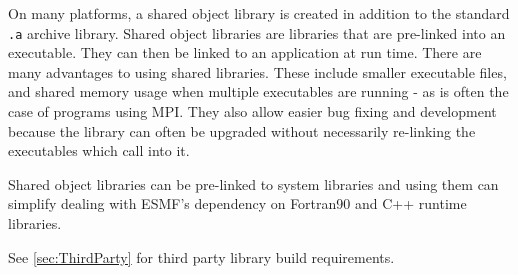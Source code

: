 On many platforms, a shared object library is created in addition to the
standard {\tt .a} archive library.
Shared object libraries are libraries that are pre-linked into an executable.
They can then be linked to an application at run time.  There are many advantages
to using shared libraries.  These include smaller executable files, and shared
memory usage when multiple executables are running - as is often the case of
programs using MPI.  They also allow easier bug fixing and development because
the library can often be upgraded without necessarily re-linking the executables
which call into it.

Shared object libraries can be pre-linked to system libraries and using them
can simplify dealing with ESMF's dependency on Fortran90 and C++ runtime 
libraries.

See \ref{sec:ThirdParty} for third party library build requirements.

